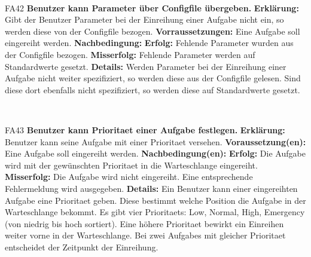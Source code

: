\documentclass[a4paper,12pt]{article}
\begin{document}
\begin{itemize}[nosep]
\begin{minipage}[t]{\linewidth}
	\end{minipage}
	\newline
	\\
	
	\begin{minipage}[t]{\linewidth}
		\item[FA42] \textbf{Benutzer kann \gls{Parameter} über \gls{Configfile} übergeben.}
		\subitem \textbf{Erklärung:} Gibt der \gls{Benutzer} \gls{Parameter} bei der Einreihung einer \gls{Aufgabe} nicht ein, so werden diese von der \gls{Configfile} bezogen.
		\subitem \textbf{Vorraussetzungen:} Eine \gls{Aufgabe} soll eingereiht werden.
		\subitem \textbf{Nachbedingung:}
		\subsubitem \textbf{Erfolg:} Fehlende \gls{Parameter} wurden aus der \gls{Configfile} bezogen.
		\subsubitem \textbf{Misserfolg:} Fehlende \gls{Parameter} werden auf Standardwerte gesetzt.
		\subitem \textbf{Details:} Werden \gls{Parameter} bei der Einreihung einer \gls{Aufgabe} nicht weiter spezifiziert, so werden diese aus der \gls{Configfile} gelesen. Sind diese dort ebenfalls nicht spezifiziert, so werden diese auf Standardwerte gesetzt.
	\end{minipage}
	\newline
	\\
	
	\begin{minipage}[t]{\linewidth}
		\item[FA43] \textbf{Benutzer kann \gls{Prioritaet} einer \gls{Aufgabe} festlegen.}
		\subitem \textbf{Erklärung:} \gls{Benutzer} kann seine \gls{Aufgabe} mit einer \gls{Prioritaet} versehen.
		\subitem \textbf{Voraussetzung(en):} Eine \gls{Aufgabe} soll eingereiht werden.
		\subitem \textbf{Nachbedingung(en):}
		\subsubitem \textbf{Erfolg:} Die \gls{Aufgabe} wird mit der gewünschten \gls{Prioritaet} in die \gls{Warteschlange} eingereiht.
		\subsubitem \textbf{Misserfolg:} Die \gls{Aufgabe} wird nicht eingereiht. Eine entsprechende Fehlermeldung wird ausgegeben.
		\subitem \textbf{Details:} Ein \gls{Benutzer} kann einer eingereihten \gls{Aufgabe} eine \gls{Prioritaet} geben. Diese bestimmt welche Position die \gls{Aufgabe} in der \gls{Warteschlange} bekommt. Es gibt vier \glspl{Prioritaet}: Low, Normal, High, Emergency (von niedrig bis hoch sortiert). Eine höhere \gls{Prioritaet} bewirkt ein Einreihen weiter vorne in der \gls{Warteschlange}. Bei zwei \glspl{Aufgabe} mit gleicher \gls{Prioritaet} entscheidet der Zeitpunkt der Einreihung.
    \end{minipage}	
	\newline
	\\
	

\end{itemize}
\end{document}
